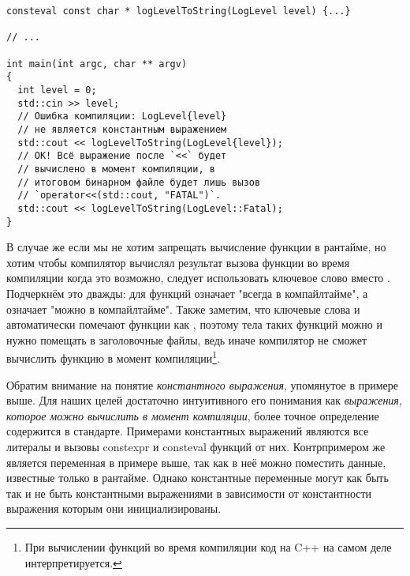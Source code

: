\begin{verbatim}
consteval const char * logLevelToString(LogLevel level) {...}

// ...

int main(int argc, char ** argv)
{
  int level = 0;
  std::cin >> level;
  // Ошибка компиляции: LogLevel{level}
  // не является константным выражением
  std::cout << logLevelToString(LogLevel{level});
  // OK! Всё выражение после `<<` будет
  // вычислено в момент компиляции, в
  // итоговом бинарном файле будет лишь вызов
  // `operator<<(std::cout, "FATAL")`.
  std::cout << logLevelToString(LogLevel::Fatal);
}
\end{verbatim}
В случае же если мы не хотим запрещать вычисление функции в рантайме, но хотим чтобы компилятор вычислял результат вызова функции во время компиляции когда это возможно, следует использовать ключевое слово  вместо .
Подчеркнём это дважды: для функций  означает "всегда в компайлтайме", а  означает "можно в компайлтайме".
Также заметим, что ключевые слова  и  автоматически помечают функции как , поэтому тела таких функций можно и нужно помещать в заголовочные файлы, ведь иначе компилятор не сможет вычислить функцию в момент компиляции\footnote{При вычислении функций во время компиляции код на C++ на самом деле интерпретируется.}.

Обратим внимание на понятие \textit{константного выражения}, упомянутое в примере выше.
Для наших целей достаточно интуитивного его понимания как \textit{выражения, которое можно вычислить в момент компиляции}, более точное определение содержится в стандарте.
Примерами константных выражений являются все литералы и вызовы constexpr и consteval функций от них.
Контрпримером же является переменная  в примере выше, так как в неё можно поместить данные, известные только в рантайме.
Однако константные переменные могут как быть так и не быть константными выражениями в зависимости от константности выражения которым они инициализированы.

